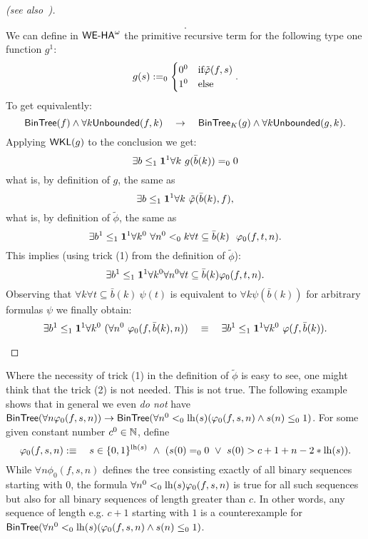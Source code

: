 \begin{proof}[ (see also~\cite{Simpson99})]
\begin{itemize}
\[\text{.}
\]
We can define in ${\textsf{\upshape WE-HA}}^{\omega}$ the primitive recursive term for the 
following type one function $g^1$:
\[
g(s):=_0\begin{cases}0^0&\text{if} \tilde{\varphi}(f,s)\\1^0&\text{else} \end{cases}\text{.}
\]
To get equivalently:
\[ 
\textsf{\upshape BinTree}(f) \wedge \forall k \textsf{\upshape Unbounded}(f,k) 
  \quad\rightarrow\quad \textsf{\upshape BinTree}_K(g) \wedge \forall k \textsf{\upshape Unbounded}(g,k) 
\text{.}
\]
Applying $\textsf{\upshape WKL}(g)$ to the conclusion we get:
\[
\exists b\leq_1\mathbf1^1\forall k\ g(\bar{b}(k))=_00
\]
what is, by definition of $g$, the same as
\[
\exists b\leq_1\one^1\forall k\ \tilde\phi(\bar{b}(k),f)
\text{,}
\]
what is, by definition of $\tilde\phi$, the same as
\[
\exists b^1\leq_1\one^1\forall k^0\ 
\forall n^0<_0 k\forall t\subseteq \bar{b}(k)\ \ \phi_0(f,t,n)
\text{.}
\]
This implies (using trick (1) from the definition of $\tilde\phi$):
\[
\exists b^1\leq_1\mathbf1^1\forall k^0\forall n^0\forall t\subseteq \bar{b}(k)
 \varphi_0(f,t,n)
\text{.}
\]
Observing that $\forall k\forall t\!\subseteq\!\bar{b}(k)\ \psi(t)$ is equivalent to
$\forall k\psi(\bar{b}(k))$ for arbitrary formulas $\psi$ we finally obtain:
\[
\exists b^1\leq_1\mathbf1^1\forall k^0\ (\forall n^0\ \varphi_0(f,\bar{b}(k),n))
\quad\equiv\quad \exists b^1\leq_1\mathbf1^1\forall k^0\ \varphi(f,\bar{b}(k))
\text{.}
\]
\end{itemize}
\end{proof}
\begin{rmk}
Where the necessity of trick (1) in the definition of $\tilde\phi$
is easy to see, one might think that the trick (2) is not needed. This
is not true. The following example shows that in general
we even {\em do not} have $\textsf{\upshape BinTree}(\forall n\varphi_0(f,s,n))\rightarrow
\textsf{\upshape BinTree}(\forall n^0<_0 \operatorname{lh}(s)(\varphi_0(f,s,n)\wedge s(n)\leq_01)$.
For some given constant number $c^0\in\mathbb{N}$, define
\[
\phi_0(f,s,n):\equiv\quad 
  s\in\{0,1\}^{\lh(s)}\ \wedge\ (s(0)=_00\ \vee\ s(0)>c+1+n-2*\lh(s))\text{.}
\]
While $\forall n\phi_0(f,s,n)$ defines the tree consisting exactly of
all binary sequences starting with $0$, the
formula $\forall n^0<_0 \operatorname{lh}(s)\varphi_0(f,s,n)$ is true for all such sequences
but also for all binary sequences of length greater than $c$. In other words,
any sequence of length e.g. $c+1$ starting with $1$ is a counterexample
for $\textsf{\upshape BinTree}(\forall n^0<_0 \operatorname{lh}(s)(\varphi_0(f,s,n)\wedge s(n)\leq_01)$.\\
\end{rmk}

